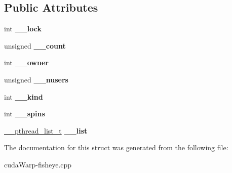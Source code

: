 \subsection*{Public Attributes}
\begin{DoxyCompactItemize}
\item 
int {\bfseries \+\_\+\+\_\+lock}\hypertarget{struct____pthread__mutex__s_a5375ddb5f0830c05dbee69ff4fb0cb8c}{}\label{struct____pthread__mutex__s_a5375ddb5f0830c05dbee69ff4fb0cb8c}

\item 
unsigned {\bfseries \+\_\+\+\_\+count}\hypertarget{struct____pthread__mutex__s_ad112cde87125268eb12193af07cd3c9c}{}\label{struct____pthread__mutex__s_ad112cde87125268eb12193af07cd3c9c}

\item 
int {\bfseries \+\_\+\+\_\+owner}\hypertarget{struct____pthread__mutex__s_a656c6680054c94e3ddc4794489b28e99}{}\label{struct____pthread__mutex__s_a656c6680054c94e3ddc4794489b28e99}

\item 
unsigned {\bfseries \+\_\+\+\_\+nusers}\hypertarget{struct____pthread__mutex__s_a3e23f27fc4d53873fefc865e1ad03d0a}{}\label{struct____pthread__mutex__s_a3e23f27fc4d53873fefc865e1ad03d0a}

\item 
int {\bfseries \+\_\+\+\_\+kind}\hypertarget{struct____pthread__mutex__s_a80d66aec6e3de9e783a0371cda792b23}{}\label{struct____pthread__mutex__s_a80d66aec6e3de9e783a0371cda792b23}

\item 
int {\bfseries \+\_\+\+\_\+spins}\hypertarget{struct____pthread__mutex__s_a6e95e981388f991c670a095cba59288d}{}\label{struct____pthread__mutex__s_a6e95e981388f991c670a095cba59288d}

\item 
\hyperlink{struct____pthread__internal__list}{\+\_\+\+\_\+pthread\+\_\+list\+\_\+t} {\bfseries \+\_\+\+\_\+list}\hypertarget{struct____pthread__mutex__s_a88e8b1fb7f4ad103720a08676e0f948a}{}\label{struct____pthread__mutex__s_a88e8b1fb7f4ad103720a08676e0f948a}

\end{DoxyCompactItemize}


The documentation for this struct was generated from the following file\+:\begin{DoxyCompactItemize}
\item 
cuda\+Warp-\/fisheye.\+cpp\end{DoxyCompactItemize}

